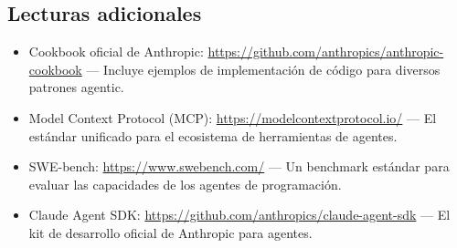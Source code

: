 \subsection{Lecturas adicionales}

\begin{itemize}
    \item Cookbook oficial de Anthropic: \url{https://github.com/anthropics/anthropic-cookbook} — Incluye ejemplos de implementación de código para diversos patrones agentic.
    \item Model Context Protocol (MCP): \url{https://modelcontextprotocol.io/} — El estándar unificado para el ecosistema de herramientas de agentes.
    \item SWE-bench: \url{https://www.swebench.com/} — Un benchmark estándar para evaluar las capacidades de los agentes de programación.
    \item Claude Agent SDK: \url{https://github.com/anthropics/claude-agent-sdk} — El kit de desarrollo oficial de Anthropic para agentes.
\end{itemize}



